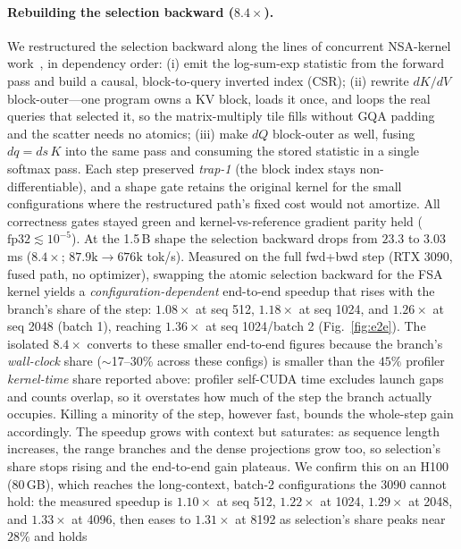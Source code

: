 \documentclass[11pt]{article}
\begin{document}
\paragraph{Rebuilding the selection backward ($8.4\times$).} We restructured the selection backward
along the lines of concurrent NSA-kernel work~\cite{fsa}, in dependency order: (i) emit the
log-sum-exp statistic from the forward pass and build a causal, block-to-query inverted index (CSR);
(ii) rewrite $dK/dV$ block-outer---one program owns a KV block, loads it once, and loops the real
queries that selected it, so the matrix-multiply tile fills without GQA padding and the scatter needs
no atomics; (iii) make $dQ$ block-outer as well, fusing $dq=ds\,K$ into the same pass and consuming
the stored statistic in a single softmax pass. Each step preserved \emph{trap-1} (the block index
stays non-differentiable), and a shape gate retains the original kernel for the small configurations
where the restructured path's fixed cost would not amortize. All correctness gates stayed green and
kernel-vs-reference gradient parity held ($\text{fp32}\lesssim10^{-5}$). At the 1.5\,B shape the
selection backward drops from $23.3$ to $3.03$\,ms ($8.4\times$; $87.9\text{k}\to676\text{k}$
tok/s). Measured on the full fwd+bwd step (RTX 3090, fused path, no optimizer), swapping the atomic
selection backward for the FSA kernel yields a \emph{configuration-dependent} end-to-end speedup that
rises with the branch's share of the step: $1.08\times$ at seq 512, $1.18\times$ at seq 1024, and
$1.26\times$ at seq 2048 (batch 1), reaching $1.36\times$ at seq 1024/batch 2 (Fig.~\ref{fig:e2e}).
The isolated $8.4\times$ converts to these smaller end-to-end figures because the branch's
\emph{wall-clock} share ($\sim$17--30\% across these configs) is smaller than the $45\%$ profiler
\emph{kernel-time} share reported above: profiler self-CUDA time excludes launch gaps and counts
overlap, so it overstates how much of the step the branch actually occupies. Killing a minority of
the step, however fast, bounds the whole-step gain accordingly. The speedup grows with context but
saturates: as sequence length increases, the range branches and the dense projections grow too, so
selection's share stops rising and the end-to-end gain plateaus. We confirm this on an H100 (80\,GB),
which reaches the long-context, batch-2 configurations the 3090 cannot hold: the measured speedup is
$1.10\times$ at seq 512, $1.22\times$ at 1024, $1.29\times$ at 2048, and $1.33\times$ at 4096, then
eases to $1.31\times$ at 8192 as selection's share peaks near $28\%$ and holds
\end{document}
